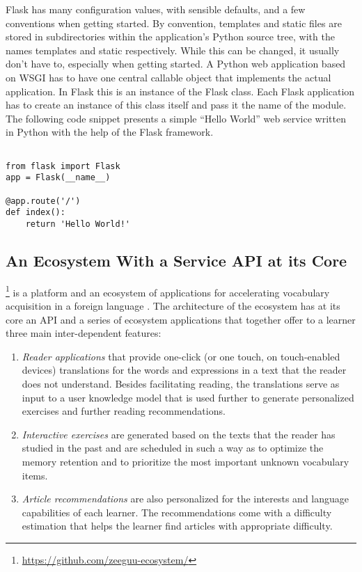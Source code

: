  Flask has many configuration values, with sensible defaults, and a few conventions when getting started. By convention, templates and static files are stored in subdirectories within the application's Python source tree, with the names templates and static respectively. While this can be changed, it usually don’t have to, especially when getting started.
%
 A Python web application based on WSGI has to have one central callable object that implements the actual application. In Flask this is an instance of the Flask class. Each Flask application has to create an instance of this class itself and pass it the name of the module. The following code snippet presents a simple ``Hello World'' web service written in Python with the help of the Flask framework. 

\begin{lstlisting}[style=custompython]

from flask import Flask
app = Flask(__name__)

@app.route('/')
def index():
    return 'Hello World!'

\end{lstlisting}



\subsection{An Ecosystem With a Service API at its Core}
\label{sec:api}
\label{sec:case}

  \zee\footnote{\url{https://github.com/zeeguu-ecosystem/}} is a platform and an ecosystem of applications for accelerating vocabulary acquisition in a foreign language \cite{Lungu16}. 
%
  The architecture of the ecosystem has at its core an API and a series of ecosystem applications that together offer to a learner three main inter-dependent features:

  \begin{enumerate}

    \item \textit{Reader applications} that provide one-click (or one touch, on touch-enabled devices) translations for the words and expressions in a text that the reader does not understand. Besides facilitating reading, the translations serve as input to a user knowledge model that is used further to generate personalized exercises and further reading recommendations.

    \item \textit{Interactive exercises} are generated based on the texts that the reader has studied in the past and are scheduled in such a way as to optimize the memory retention and to prioritize the most important unknown vocabulary items.

    \item \textit{Article recommendations} are also personalized for the interests and language capabilities of each learner. The recommendations come with a difficulty estimation that helps the learner find articles with appropriate difficulty.

  \end{enumerate}

